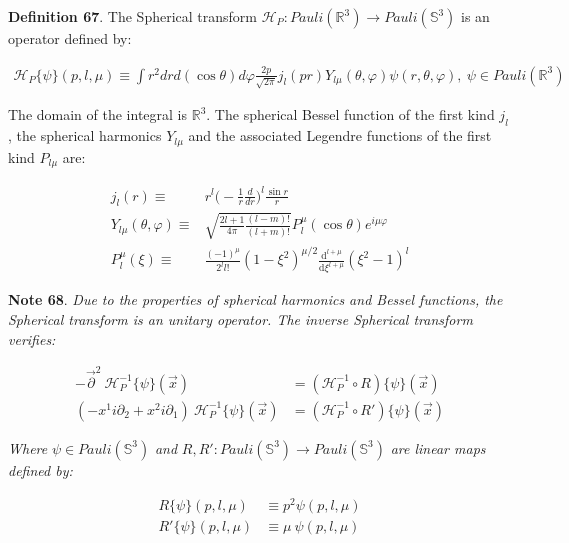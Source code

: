 \documentclass[11pt]{book}
\begin{document}
\textbf{Definition 67}. The Spherical transform
\(\mathcal{H}_{P}: Pauli(\mathbb{R}^3)\to Pauli(\mathbb{S}^3)\) is an
operator defined by:

\begin{equation}\begin{aligned}
\mathcal{H}_{P}\{\psi\}(p,l,\mu)\equiv\int r^2 dr d(\cos\theta)d\varphi
\frac{2 p}{\sqrt{2\pi}}j_l(pr)Y_{l\mu}(\theta,\varphi)\psi(r,\theta,\varphi),\ \psi\in Pauli(\mathbb{R}^3)\end{aligned}\end{equation}

The domain of the integral is \(\mathbb{R}^3\). The spherical Bessel
function of the first kind \(j_l\)
\cite{Adkins2013Three}, the spherical
harmonics
\(Y_{l\mu}\)\cite{Szmytkowski2007Recurrence} and the associated Legendre functions of the first kind
\(P_{l\mu}\) are:

\begin{equation}\begin{aligned}
j_l(r)\equiv& r^l\Big(-\frac{1}{r}\frac{d}{dr}\Big)^l \frac{\sin
  r}{r}\\
Y_{l\mu}(\theta,\varphi)\equiv&\sqrt{\frac{2l+1}{4\pi}\frac{(l-m)!}{(l+m)!}}
P_{l}^\mu(\cos\theta)e^{i\mu \varphi}\\
P_{l}^\mu(\xi)\equiv&\frac{(-1)^{\mu}}{2^{l}l!}(1-\xi^{2})^{\mu/2}
\frac{\mathrm{d}^{l+\mu}}{\mathrm{d}\xi^{l+\mu}}(\xi^{2}-1)^{l}\end{aligned}\end{equation}

\textbf{Note 68}. \emph{Due to the properties of spherical harmonics and
Bessel functions, the Spherical transform is an unitary operator. The
inverse Spherical transform verifies: }

\begin{equation}\begin{aligned}
-\vec{\partial}^2\
\mathcal{H}_P^{-1}\{\psi\}(\vec{x})&=
(\mathcal{H}_P^{-1}\circ R)\{\psi\}(\vec{x})\\
(-x^1i\partial_2+x^2i\partial_1)
\ \mathcal{H}_P^{-1}\{\psi\}(\vec{x})&=
(\mathcal{H}_P^{-1}\circ R')\{\psi\}(\vec{x})\end{aligned}\end{equation}

\emph{ Where }\(\psi\in Pauli(\mathbb{S}^3)\)\emph{ and
}\(R,R':Pauli(\mathbb{S}^3)\to Pauli(\mathbb{S}^3)\)\emph{ are linear
maps defined by: }

\begin{equation}\begin{aligned}
R\{\psi\}(p,l,\mu)&\equiv p^2 \psi(p,l,\mu)\\
R'\{\psi\}(p,l,\mu)&\equiv \mu\ \psi(p,l,\mu)\end{aligned}\end{equation}
\end{document}
